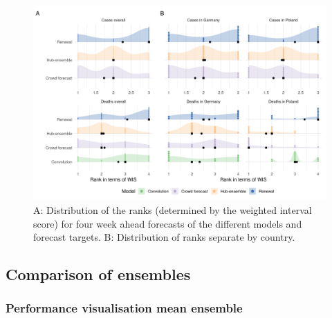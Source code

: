 \documentclass[
]{article}
\begin{document}
\begin{figure}[H]
\includegraphics[width=1\linewidth,]{../analysis/plots/distribution_scores_wis-4-ranks} \caption{A: Distribution of the ranks (determined by the weighted interval score) for four week ahead forecasts of the different models and forecast targets. B: Distribution of ranks separate by country.}\label{fig:distribution-scores-ranks-4}
\end{figure}

\clearpage

\hypertarget{comparison-of-ensembles}{%
\subsection{Comparison of ensembles}\label{comparison-of-ensembles}}

\hypertarget{performance-visualisation-mean-ensemble}{%
\subsubsection{Performance visualisation mean ensemble}\label{performance-visualisation-mean-ensemble}}
\end{document}
